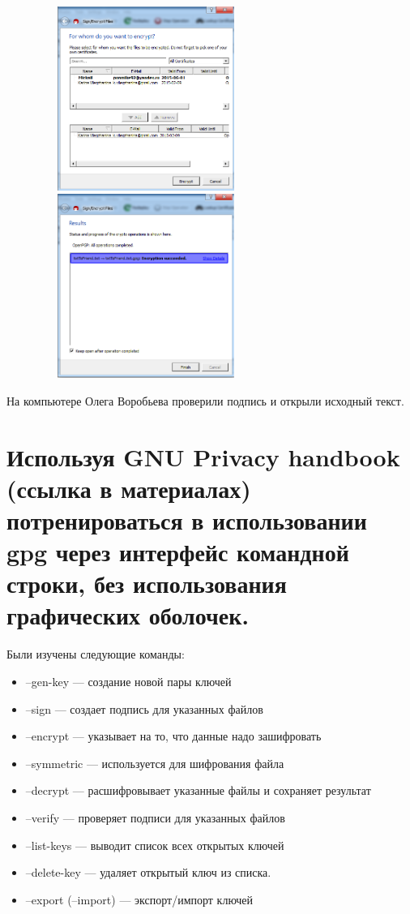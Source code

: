 \documentclass[utf8x, 12pt]{G7-32}
\begin{document}
\begin{figure}[hhh!]
	\begin{center}
		\includegraphics[width=7cm, height=6cm]{img/7_1}
		\includegraphics[width=7cm, height=6cm]{img/7_2}
	\end{center}
\end{figure}	

На компьютере Олега Воробьева проверили подпись и открыли исходный текст.

\newpage

\section{Используя GNU Privacy handbook (ссылка в материалах) потренироваться в использовании gpg через интерфейс командной строки, без использования графических оболочек.}

Были изучены следующие команды:

\begin{itemize}
	\item –gen-key --- создание новой пары ключей
	\item –sign --- создает подпись для указанных файлов
	\item –encrypt --- указывает на то, что данные надо зашифровать
	\item –symmetric --- используется для шифрования файла
	\item –decrypt --- расшифровывает указанные файлы и сохраняет результат
	\item –verify --- проверяет подписи для указанных файлов
	\item –list-keys --- выводит список всех открытых ключей
	\item –delete-key --- удаляет открытый ключ из списка. 
	\item –export (–import) --- экспорт/импорт ключей
\end{itemize}
\end{document}
